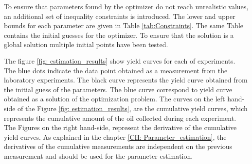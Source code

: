 \documentclass[../Article_Model_Parameters.tex]{subfiles}
\begin{document}
	To ensure that parameters found by the optimizer do not reach unrealistic values, an additional set of inequality constraints is introduced. The lower and upper bounds for each parameter are given in Table \ref{tab:Constraints}. The same Table contains the initial guesses for the optimizer. To ensure that the solution is a global solution multiple initial points have been tested.

	\begin{table}[!h]
		\centering
	\caption{Constraints of the parameter estimation problem}
	\label{tab:Constraints}
	\end{table}

	
	
	The figure \ref{fig: estimation_results} show yield curves for each of experiments. The blue dots indicate the data point obtained as a measurement from the laboratory experiments. The black curve represents the yield curve obtained from the initial guess of the parameters. The blue curve correspond to yield curve obtained as a solution of the optimization problem. The curves on the left hand-side of the Figure \ref{fig: estimation_results}, are the cumulative yield curves, which represents the cumulative amount of the oil collected during each experiment. The Figures on the right hand-side, represent the derivative of the cumulative yield curves. As explained in the chapter \ref{CH: Parameter_estimation}, the derivatives of the cumulative measurements are independent on the previous measurement and should be used for the parameter estimation.
\end{document}
